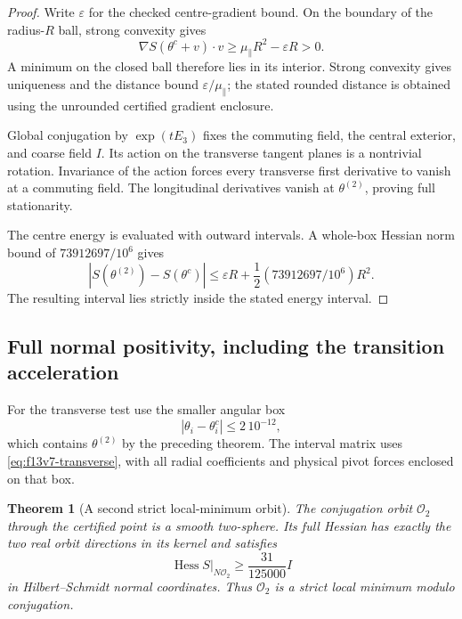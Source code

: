 \documentclass[11pt,oneside]{article}
\newtheorem{theorem}{Theorem}[section]
\DeclareMathOperator{\Hess}{Hess}
\begin{document}
\begin{proof}
Write \(\varepsilon\) for the checked
centre-gradient bound. On the boundary
of the radius-\(R\) ball, strong convexity
gives
\[
 \nabla S(\theta^c+v)\cdot v
 \ge\mu_\parallel R^2-\varepsilon R>0.
\]
A minimum on the closed ball therefore
lies in its interior. Strong convexity
gives uniqueness and the distance bound
\(\varepsilon/\mu_\parallel\); the stated
rounded distance is obtained using the
unrounded certified gradient enclosure.

Global conjugation by \(\exp(tE_3)\)
fixes the commuting field, the central
exterior, and coarse field \(I\). Its
action on the transverse tangent planes
is a nontrivial rotation. Invariance of
the action forces every transverse first
derivative to vanish at a commuting field.
The longitudinal derivatives vanish at
\(\theta^{(2)}\), proving full stationarity.

The centre energy is evaluated with
outward intervals. A whole-box Hessian
norm bound of \(73912697/10^6\) gives
\[
 |S(\theta^{(2)})-S(\theta^c)|
 \le\varepsilon R+\frac12(73912697/10^6)R^2 .
\]
The resulting interval lies strictly
inside the stated energy interval.
\end{proof}

\subsection{Full normal positivity, including the transition acceleration}

For the transverse test use the smaller
angular box
\[
 |\theta_i-\theta_i^c|\le2\,10^{-12},
\]
which contains \(\theta^{(2)}\) by the
preceding theorem. The interval matrix
uses \eqref{eq:f13v7-transverse}, with all
radial coefficients and physical pivot
forces enclosed on that box.

\begin{theorem}[A second strict local-minimum orbit]
\label{thm:f13v8-minimum}
The conjugation orbit \(\mathcal O_2\)
through the certified point is a smooth
two-sphere. Its full Hessian has exactly
the two real orbit directions in its
kernel and satisfies
\[
 \Hess S|_{N\mathcal O_2}
 \ge\frac{31}{125000}I
\]
in Hilbert--Schmidt normal coordinates.
Thus \(\mathcal O_2\) is a strict local
minimum modulo conjugation.
\end{theorem}
\end{document}
